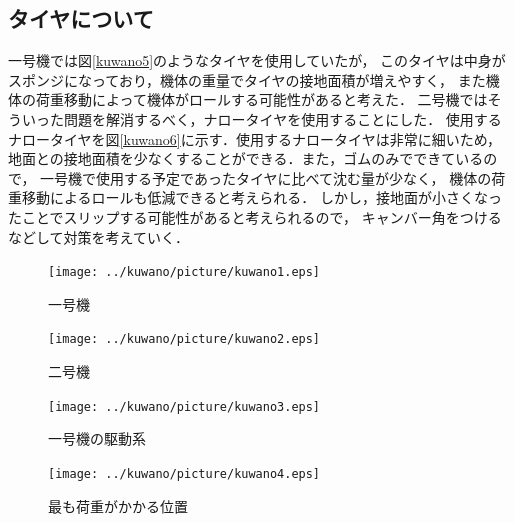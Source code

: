 \subsection{タイヤについて}
一号機では図\ref{kuwano5}のようなタイヤを使用していたが，
このタイヤは中身がスポンジになっており，機体の重量でタイヤの接地面積が増えやすく，
また機体の荷重移動によって機体がロールする可能性があると考えた．
二号機ではそういった問題を解消するべく，ナロータイヤを使用することにした．
使用するナロータイヤを図\ref{kuwano6}に示す．使用するナロータイヤは非常に細いため，
地面との接地面積を少なくすることができる．また，ゴムのみでできているので，
一号機で使用する予定であったタイヤに比べて沈む量が少なく，
機体の荷重移動によるロールも低減できると考えられる．
しかし，接地面が小さくなったことでスリップする可能性があると考えられるので，
キャンバー角をつけるなどして対策を考えていく．

\begin{figure}[H]
  \begin{center}
    \texttt{[image: ../kuwano/picture/kuwano1.eps]}
    \caption{一号機}
    \label{kuwano1}
  \end{center}
\end{figure}

\begin{figure}[H]
  \begin{center}
    \texttt{[image: ../kuwano/picture/kuwano2.eps]}
    \caption{二号機}
    \label{kuwano2}
  \end{center}
\end{figure}

\begin{figure}[H]
  \begin{center}
    \texttt{[image: ../kuwano/picture/kuwano3.eps]}
    \caption{一号機の駆動系}
    \label{kuwano3}
  \end{center}
\end{figure}

\begin{figure}[H]
  \begin{center}
    \texttt{[image: ../kuwano/picture/kuwano4.eps]}
    \caption{最も荷重がかかる位置}
    \label{kuwano4}
  \end{center}
\end{figure}

